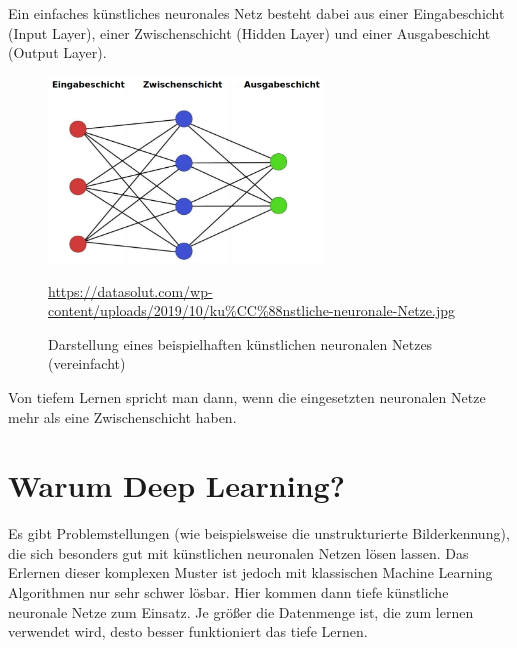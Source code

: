\newpage

Ein einfaches künstliches neuronales Netz besteht dabei aus einer Eingabeschicht (Input Layer), einer Zwischenschicht (Hidden Layer) und einer Ausgabeschicht (Output Layer). \cite{datasolut2}

\begin{figure}[H]
	\centering
	\includegraphics[width=0.65\textwidth]{kapitel3/images/Simples_Neuronales_Netz.jpg}
	\caption{Darstellung eines beispielhaften künstlichen neuronalen Netzes \\ (vereinfacht)}
	\label{fig:simples-neuronales-netz}
	\vspace{0.2cm}
	\quelle\url{https://datasolut.com/wp-content/uploads/2019/10/ku%CC%88nstliche-neuronale-Netze.jpg}
\end{figure}

Von tiefem Lernen spricht man dann, wenn die eingesetzten neuronalen Netze mehr als eine Zwischenschicht haben.  \cite{datasolut2} 

\section{Warum Deep Learning?}

Es gibt Problemstellungen (wie beispielsweise die unstrukturierte Bilderkennung), die sich besonders gut mit künstlichen neuronalen Netzen lösen lassen. Das Erlernen dieser komplexen Muster ist jedoch mit klassischen Machine Learning Algorithmen nur sehr schwer lösbar. Hier kommen dann tiefe künstliche neuronale Netze zum Einsatz. Je größer die Datenmenge ist, die zum lernen verwendet wird, desto besser funktioniert das tiefe Lernen. \cite{datasolut2}

